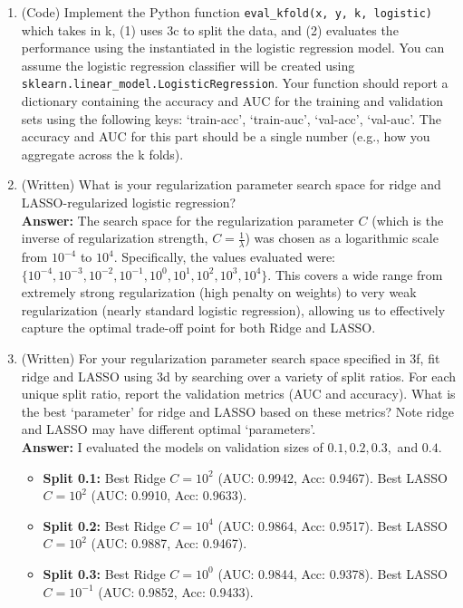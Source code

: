 \documentclass[a4paper,12pt]{article}
\begin{document}
\begin{enumerate}
\begin{enumerate}
        \item[(e)] (Code) Implement the Python function \texttt{eval\_kfold(x, y, k, logistic)} which takes in k, (1) uses 3c to split the data, and (2) evaluates the performance using the instantiated in the logistic regression model. You can assume the logistic regression classifier will be created using \texttt{sklearn.linear\_model.LogisticRegression}. Your function should report a dictionary containing the accuracy and AUC for the training and validation sets using the following keys: `train-acc', `train-auc', `val-acc', `val-auc'. The accuracy and AUC for this part should be a single number (e.g., how you aggregate across the k folds).
        \item[(f)] (Written) What is your regularization parameter search space for ridge and LASSO-regularized logistic regression? \\
        \textbf{Answer:} The search space for the regularization parameter $C$ (which is the inverse of regularization strength, $C = \frac{1}{\lambda}$) was chosen as a logarithmic scale from $10^{-4}$ to $10^{4}$. Specifically, the values evaluated were: 
        $\{10^{-4}, 10^{-3}, 10^{-2}, 10^{-1}, 10^{0}, 10^{1}, 10^{2}, 10^{3}, 10^{4}\}$. This covers a wide range from extremely strong regularization (high penalty on weights) to very weak regularization (nearly standard logistic regression), allowing us to effectively capture the optimal trade-off point for both Ridge and LASSO.
        \item[(g)] (Written) For your regularization parameter search space specified in 3f, fit ridge and LASSO using 3d by searching over a variety of split ratios. For each unique split ratio, report the validation metrics (AUC and accuracy). What is the best `parameter' for ridge and LASSO based on these metrics? Note ridge and LASSO may have different optimal `parameters'. \\
        \textbf{Answer:} I evaluated the models on validation sizes of $0.1, 0.2, 0.3,$ and $0.4$. 
        \begin{itemize}
            \item \textbf{Split 0.1:} Best Ridge $C = 10^2$ (AUC: 0.9942, Acc: 0.9467). Best LASSO $C = 10^2$ (AUC: 0.9910, Acc: 0.9633).
            \item \textbf{Split 0.2:} Best Ridge $C = 10^4$ (AUC: 0.9864, Acc: 0.9517). Best LASSO $C = 10^2$ (AUC: 0.9887, Acc: 0.9467).
            \item \textbf{Split 0.3:} Best Ridge $C = 10^0$ (AUC: 0.9844, Acc: 0.9378). Best LASSO $C = 10^{-1}$ (AUC: 0.9852, Acc: 0.9433).

\end{itemize}
\end{enumerate}
\end{enumerate}
\end{document}
